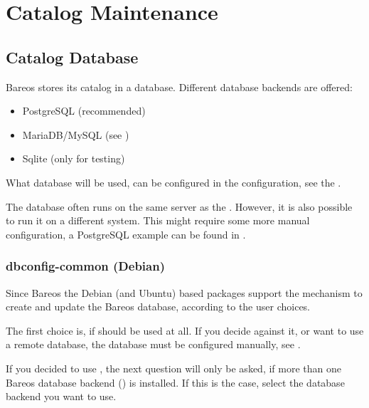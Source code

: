 
\chapter{Catalog Maintenance}
\label{CatMaintenanceChapter}

\section{Catalog Database}

Bareos stores its catalog in a database.
Different database backends are offered:
\begin{itemize}
    \item PostgreSQL (recommended)
    \item MariaDB/MySQL (see )
    \item Sqlite (only for testing)
\end{itemize}

What database will be used, can be configured in the \bareosDir configuration, see the .

The database often runs on the same server as the \bareosDir.
However, it is also possible to run it on a different system.
This might require some more manual configuration, a PostgreSQL example can be found in .



\subsection{dbconfig-common (Debian)}
\label{sec:dbconfig}

Since Bareos  the Debian (and Ubuntu) based packages support the  mechanism to create and update the Bareos database, according to the user choices.

The first choice is, if  should be used at all.
If you decide against it, or want to use a remote database, the database must be configured manually, see .

If you decided to use , the next question will only be asked, if more than one
Bareos database backend () is installed.
If this is the case, select the database backend you want to use.


